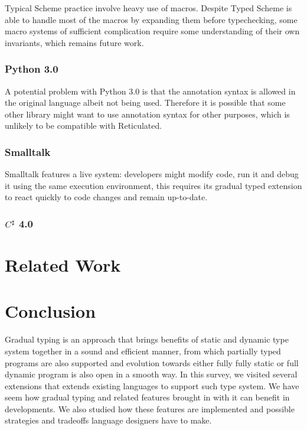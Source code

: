 Typical Scheme practice involve heavy use of macros.
Despite Typed Scheme is able to handle most of the macros by expanding them before typechecking,
some macro systems of sufficient complication require some understanding of their own invariants,
which remains future work.

\subsubsection{Python 3.0}

A potential problem with Python 3.0 is that the annotation syntax is allowed in the original language
albeit not being used. Therefore it is possible that some other library might want to use annotation syntax for
other purposes, which is unlikely to be compatible with Reticulated.

\subsubsection{Smalltalk}

Smalltalk features a live system: developers might modify code, run it and debug it using the same execution environment,
this requires its gradual typed extension to react quickly to code changes and remain up-to-date.

\subsubsection{$C^\sharp$ 4.0}

\section{Related Work}




\renewcommand{\thechapter}{5}
\section{Conclusion}

Gradual typing is an approach that brings benefits of static and dynamic type system
together in a sound and efficient manner, from which partially typed programs are also supported
and evolution towards either fully fully static or full dynamic program is also open in a smooth way.
In this survey, we visited several extensions that extends existing languages to support such type system.
We have seem how gradual typing and related features brought in with it can benefit in developments.
We also studied how these features are implemented and possible strategies and tradeoffs language designers have
to make.




